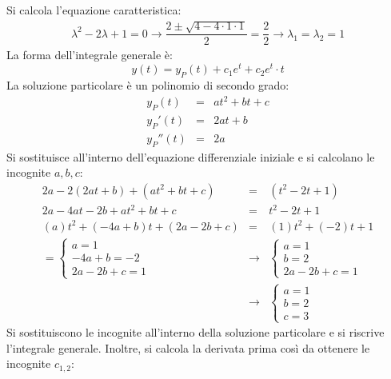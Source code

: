 \documentclass[a4paper]{article}
\begin{document}
	\noindent
	Si calcola l'equazione caratteristica:
	\begin{gather*}
		\lambda^{2} - 2\lambda + 1 = 0 \rightarrow
		\dfrac{2 \pm \sqrt{4 - 4 \cdot 1 \cdot 1}}{2} = \dfrac{2}{2} \rightarrow \lambda_{1} = \lambda_{2} = 1
	\end{gather*}
	La forma dell'integrale generale è:
	\begin{equation*}
		y\left(t\right) = y_{P}\left(t\right) + c_{1}e^{t} + c_{2}e^{t} \cdot t
	\end{equation*}
	La soluzione particolare è un polinomio di secondo grado:
	\begin{equation*}
		\begin{array}{rcl}
			y_{P}\left(t\right) &=& at^{2} + bt + c \\
			y_{P}'\left(t\right) &=& 2at + b \\
			y_{P}''\left(t\right) &=& 2a
		\end{array}
	\end{equation*}
	Si sostituisce all'interno dell'equazione differenziale iniziale e si calcolano le incognite $a,b,c$:
	\begin{equation*}
		\begin{array}{rcl}
			2a - 2\left(2at + b\right) + \left(at^{2} + bt + c\right) &=& \left(t^{2} -2t +1\right) \\ [.5em]
			2a - 4at - 2b + at^{2} + bt + c &=& t^{2} -2t +1 \\ [.5em]
			\left(a\right)t^{2} + \left(-4a+b\right)t + \left(2a - 2b + c\right) &=& \left(1\right)t^{2} + \left(-2\right)t + 1 \\ [.5em]
			= \begin{cases}
				a = 1 \\
				-4a+b = -2 \\
				2a - 2b + c = 1
			\end{cases}
			&\rightarrow&
			\begin{cases}
				a = 1 \\
				b = 2 \\
				2a - 2b + c = 1
			\end{cases} \\ [2em]
			&\rightarrow&
			\begin{cases}
				a = 1 \\
				b = 2 \\
				c = 3
			\end{cases}
		\end{array}
	\end{equation*}
	Si sostituiscono le incognite all'interno della soluzione particolare e si riscrive l'integrale generale. Inoltre, si calcola la derivata prima così da ottenere le incognite $c_{1,2}$:
\end{document}
